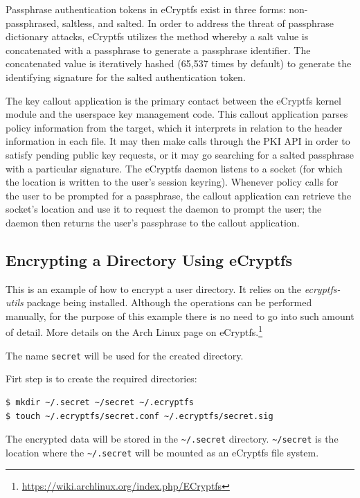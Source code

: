 Passphrase authentication tokens in eCryptfs exist in three forms: non-passphrased, saltless, and salted. In order to address the threat of passphrase dictionary attacks, eCryptfs utilizes the method whereby a salt value is concatenated with a passphrase to generate a passphrase identifier. The concatenated value is iteratively hashed (65,537 times by default) to generate the identifying signature for the salted authentication token.

The key callout application is the primary contact between the eCryptfs kernel module and the userspace key management code. This callout application parses policy information from the target, which it interprets in relation to the header information in each file. It may then make calls through the PKI API in order to satisfy pending public key requests, or it may go searching for a salted passphrase with a particular signature. The eCryptfs daemon listens to a socket (for which the location is written to the user’s session keyring). Whenever policy calls for the user to be prompted for a passphrase, the callout application can retrieve the socket’s location and use it to request the daemon to prompt the user; the daemon then returns the user’s passphrase to the callout application.

\subsection{Encrypting a Directory Using eCryptfs}
\label{sub-sec:encrypt-dir-ecryptfs}

This is an example of how to encrypt a user directory. It relies on the \textit{ecryptfs-utils} package being installed. Although the operations can be performed manually, for the purpose of this example there is no need to go into such amount of detail. More details on the Arch Linux page on eCryptfs.\footnote{\url{https://wiki.archlinux.org/index.php/ECryptfs}}

The name \texttt{secret} will be used for the created directory.

Firt step is to create the required directories:
\begin{lstlisting}[numbers=none]
$ mkdir ~/.secret ~/secret ~/.ecryptfs
$ touch ~/.ecryptfs/secret.conf ~/.ecryptfs/secret.sig
\end{lstlisting}

The encrypted data will be stored in the \texttt{\textasciitilde/.secret} directory.
\texttt{\textasciitilde/secret} is the location where the \texttt{\textasciitilde/.secret} will be mounted as an eCryptfs file system.

